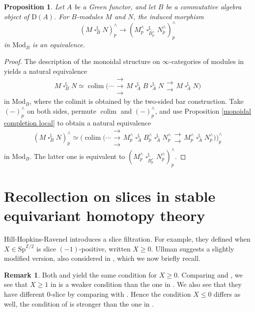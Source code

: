 \documentclass[10pt]{amsart}
\newtheorem{prop}[thm]{Proposition}
\theoremstyle{definition}
\newtheorem{rmk}[thm]{Remark}
\numberwithin{equation}{section}
\renewcommand{\L}{\mathbb{L}}
\newcommand{\Z}{\mathbb{Z}}
\newcommand{\rD}{\mathrm{D}}
\newcommand{\Mod}{\mathrm{Mod}}
\newcommand{\Sp}{\mathrm{Sp}}
\newcommand{\colim}{\mathop{\mathrm{colim}}}
\DeclareMathOperator{\sotimes}{\square}
\begin{document}
\begin{prop}
\label{monoidal completion algebra}
Let $A$ be a Green functor,
and let $B$ be a commutative algebra object of $\rD(A)$.
For $B$-modules $M$ and $N$,
the induced morphism
\[
(M\sotimes_B^\L N)_p^\wedge
\to
(M_p^\wedge \sotimes_{B_p^\wedge }^\L N_p^\wedge)_p^\wedge
\]
in $\Mod_B$ is an equivalence.
\end{prop}
\begin{proof}
The description of the monoidal structure on $\infty$-categories of modules in \cite[section 4.4.1, Theorem 4.5.2.1(2)]{HA} yields a natural equivalence
\[
M\sotimes_B^\L N
\simeq
\colim
\big(
\cdots
\substack{\rightarrow\\[-1em] \rightarrow \\[-1em] \rightarrow}
M\sotimes_{A}^\L B \sotimes_{A}^\L N
\substack{\rightarrow\\[-1em] \rightarrow}
M\sotimes_{A}^\L N
\big)
\]
in $\Mod_B$,
where the colimit is obtained by the two-sided bar construction.
Take $(-)_p^\wedge$ on both sides,
permute $\colim$ and $(-)_p^\wedge$,
and use Proposition \ref{monoidal completion local} to obtain a natural equivalence
\[
(M\sotimes_B^\L N)_p^\wedge
\simeq
\big(
\colim
\big(
\cdots
\substack{\rightarrow\\[-1em] \rightarrow \\[-1em] \rightarrow}
M_p^\wedge \sotimes_{A}^\L B_p^\wedge \sotimes_{A}^\L N_p^\wedge
\substack{\rightarrow\\[-1em] \rightarrow}
M_p^\wedge \sotimes_{A}^\L N_p^\wedge
\big)
\big)_p^\wedge
\]
in $\Mod_B$.
The latter one is equivalent to $(M_p^\wedge \sotimes_{B_p^\wedge }^\L N_p^\wedge)_p^\wedge$.
\end{proof}





\section{Recollection on slices in stable equivariant homotopy theory}
\label{sec3}

Hill-Hopkins-Ravenel \cite[section 4]{HHR} introduces a slice filtration.
For example, they defined when $X\in \Sp^{\Z/2}$ is slice $(-1)$-positive, written $X\geq 0$.
Ullman \cite{Ull13} suggests a slightly modified version,
also considered in \cite{HHR21}, which we now briefly recall. 

\begin{rmk}\label{compareslices}
Both \cite{HHR} and \cite{HHR21} yield the same condition for $X\geq 0$. Comparing \cite[4.48]{HHR} and \cite[11.1.18]{HHR21}, we see that $X\geq 1$ in \cite{HHR} is a weaker condition than the one in \cite{HHR21}. We also see that they have different $0$-slice by comparing \cite[4.50]{HHR} with \cite[11.1.45]{HHR21}. Hence the condition $X\leq 0$ differs as well, the condition of \cite{HHR} is stronger than the one in \cite[11.1.18 (iv)]{HHR21}.
\end{rmk}
\end{document}
